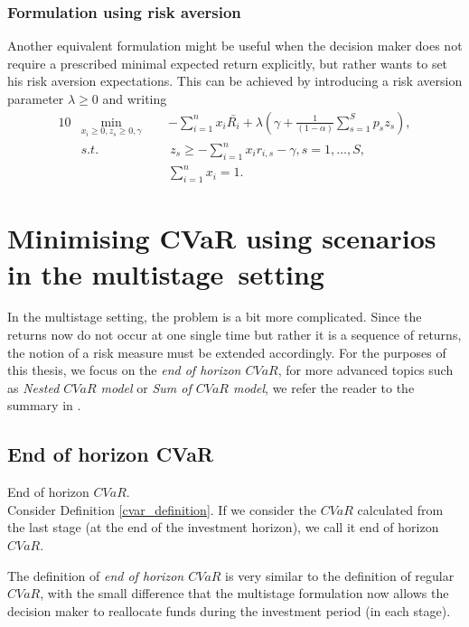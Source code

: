 \subsubsection*{Formulation using risk aversion}
Another equivalent formulation might be useful when the decision maker does not require a prescribed minimal expected return explicitly, but rather wants to set his risk aversion expectations. This can be achieved by introducing a risk aversion parameter $\lambda \geq 0$ and writing
\begin{alignat}{10}
& \underset{x_i \geq 0 , z_s \geq 0, \gamma}{\min}  \, \, \, && - \sum_{i=1}^{n} x_i \bar{R_i} + \lambda \left( \gamma + \frac{1}{(1-\alpha)} \sum_{s=1}^S p_s z_s \right), \label{eq:cvar_risk_aversion} \\
&s.t. && \, z_s \geq  -\sum_{i=1}^{n} x_i r_{i,s} -\gamma, s=1,\dots,S, \nonumber \\
&  && \sum_{i=1}^{n} x_i = 1. \nonumber
\end{alignat}
\newpage
\section{Minimising CVaR using scenarios in the multistage~setting}
In the multistage setting, the problem is a bit more complicated. Since the returns now do not occur at one single time but rather it is a sequence of returns, the notion of a risk measure must be extended accordingly. For the purposes of this thesis, we focus on the \textit{end of horizon $CVaR$}, for more advanced topics such as \textit{Nested $CVaR$ model} or \textit{Sum of $CVaR$ model}, we refer the reader to the summary in \cite[Section 1.4.]{kozmikv_phdthesis}.

\subsection{End of horizon CVaR}

\begin{defn}{\normalfont End of horizon $CVaR$.} \\
Consider Definition \ref{cvar_definition}. If we consider the $CVaR$ calculated from the last stage (at the end of the investment horizon), we call it end of horizon $CVaR$.
\end{defn}
The definition of \textit{end of horizon $CVaR$} is very similar to the definition of regular $CVaR$, with the small difference that the multistage formulation now allows the decision maker to reallocate funds during the investment period (in each stage). 

